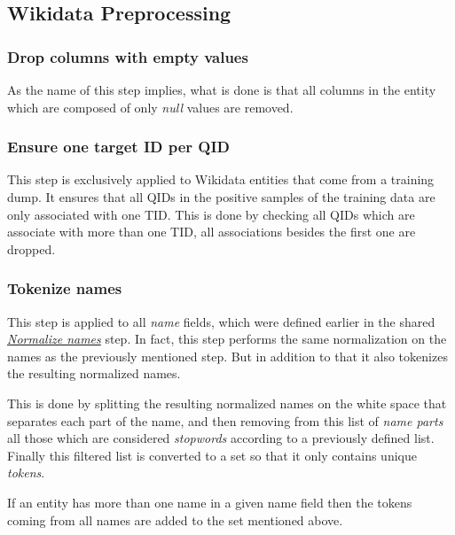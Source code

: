 \documentclass[epsfig,a4paper,11pt,titlepage,twoside,openany]{book}
\begin{document}
\subsection{Wikidata Preprocessing}
\label{sec:data-preprocessing-wikidata}

\subsubsection{Drop columns with empty values}
\label{sec:data-preprocessiong-wik-drop-empty}

As the name of this step implies, what is done is that all columns in the entity which are composed of only \textit{null} values are removed. 

\subsubsection{Ensure one target ID per QID}
\label{sec:data-preprocessiong-name-one-tid}

This step is exclusively applied to Wikidata entities that come from a training dump. It ensures that all QIDs in the positive samples of the training data are only associated with one TID. This is done by checking all QIDs which are associate with more than one TID, all associations besides the first one are dropped. 

\subsubsection{Tokenize names}
\label{sec:data-preprocessiong-wik-name-tokenization}

This step is applied to all \textit{name} fields, which were defined earlier in the shared \hyperref[sec:data-preprocessiong-name-normalization]{\textit{Normalize names}} step. In fact, this step performs the same normalization on the names as the previously mentioned step. But in addition to that it also tokenizes the resulting normalized names. 

This is done by splitting the resulting normalized names on the white space that separates each part of the name, and then removing from this list of \textit{name parts} all those which are considered \textit{stopwords} according to a previously defined list. Finally this filtered list is converted to a set so that it only contains unique \textit{tokens}. 

If an entity has more than one name in a given name field then the tokens coming from all names are added to the set mentioned above. 
\end{document}
